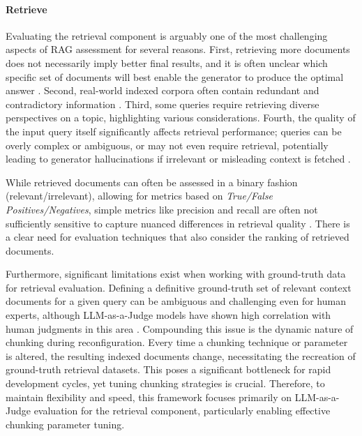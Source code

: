 \paragraph{Retrieve}
Evaluating the retrieval component is arguably one of the most challenging aspects of RAG assessment for several reasons. First, retrieving more documents does not necessarily imply better final results, and it is often unclear which specific set of documents will best enable the generator to produce the optimal answer \cite{Jin.5222024}. Second, real-world indexed corpora often contain redundant and contradictory information \cite{Yu.2024}. Third, some queries require retrieving diverse perspectives on a topic, highlighting various considerations. Fourth, the quality of the input query itself significantly affects retrieval performance; queries can be overly complex or ambiguous, or may not even require retrieval, potentially leading to generator hallucinations if irrelevant or misleading context is fetched \cite{Huang_2023, Mallen.2022}.

While retrieved documents can often be assessed in a binary fashion (relevant/irrelevant), allowing for metrics based on \textit{True/False Positives/Negatives}, simple metrics like precision and recall are often not sufficiently sensitive to capture nuanced differences in retrieval quality \cite{Yu.2024}. There is a clear need for evaluation techniques that also consider the ranking of retrieved documents.

Furthermore, significant limitations exist when working with ground-truth data for retrieval evaluation. Defining a definitive ground-truth set of relevant context documents for a given query can be ambiguous and challenging even for human experts, although LLM-as-a-Judge models have shown high correlation with human judgments in this area \cite{Chiang.2023}. Compounding this issue is the dynamic nature of chunking during reconfiguration. Every time a chunking technique or parameter is altered, the resulting indexed documents change, necessitating the recreation of ground-truth retrieval datasets. This poses a significant bottleneck for rapid development cycles, yet tuning chunking strategies is crucial. Therefore, to maintain flexibility and speed, this framework focuses primarily on LLM-as-a-Judge evaluation for the retrieval component, particularly enabling effective chunking parameter tuning.

